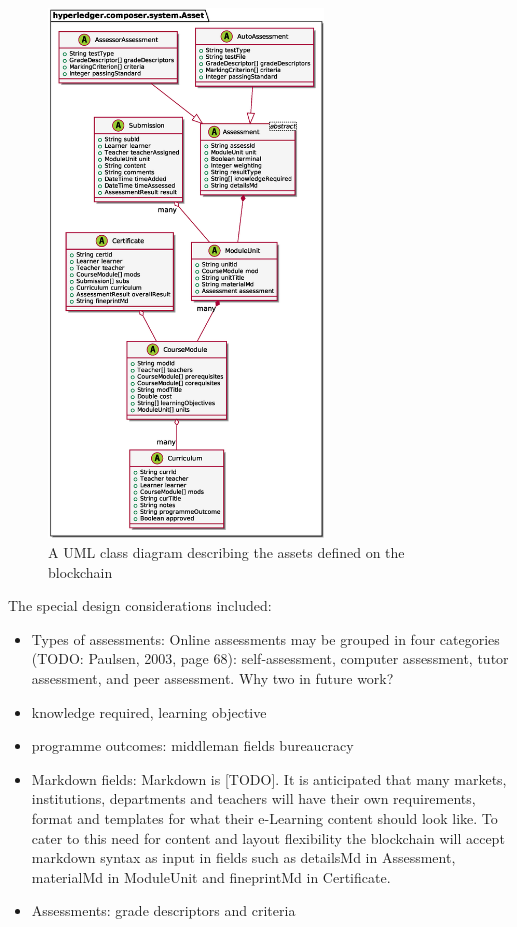\begin{figure}[!ht] 
    \centering    
    \includegraphics[width=0.65\textwidth]{assets}
    \caption[Assets Class Diagram]
        {A UML class diagram describing the assets defined on the blockchain} 
    \label{fig:assets}
\end{figure}

The special design considerations included:
\begin{itemize}
    \setlength\itemsep{0em}            
    \item Types of assessments: Online assessments may be grouped in four categories (TODO: Paulsen, 2003, page 68): 
    self-assessment, computer assessment, tutor assessment, and peer assessment. Why two in future work?
    \item knowledge required, learning objective
    \item programme outcomes: middleman fields bureaucracy
    \item Markdown fields: Markdown is [TODO]. It is anticipated that many markets, institutions, departments and teachers 
    will have their own requirements, format and templates for what their e-Learning content should look like. To cater to 
    this need for content and layout flexibility the blockchain will accept markdown syntax as input in fields such as 
    detailsMd in Assessment, materialMd in ModuleUnit and fineprintMd in Certificate.
    \item Assessments: grade descriptors and criteria
\end{itemize}

